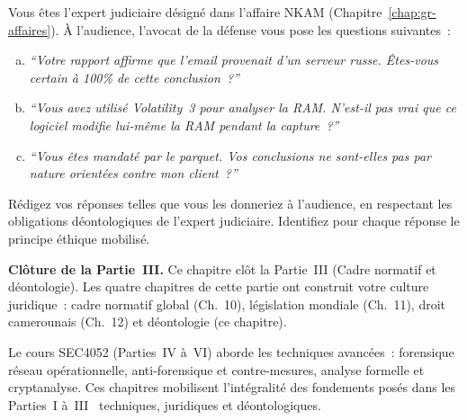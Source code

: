 \begin{boxexo}[title={\ding{45}\quad Exercice~13.3. Simulation décision éthique \niveauexpert}]
Vous êtes l'expert judiciaire désigné dans l'affaire NKAM
(Chapitre~\ref{chap:gr-affaires}). À l'audience, l'avocat de la défense
vous pose les questions suivantes~:
\begin{enumerate}[(a)]
    \item \textit{``Votre rapport affirme que l'email provenait d'un
          serveur russe. Êtes-vous certain à 100\% de cette conclusion~?''}
    \item \textit{``Vous avez utilisé Volatility~3 pour analyser la RAM.
          N'est-il pas vrai que ce logiciel modifie lui-même la RAM
          pendant la capture~?''}
    \item \textit{``Vous êtes mandaté par le parquet. Vos conclusions
          ne sont-elles pas par nature orientées contre mon client~?''}
\end{enumerate}
Rédigez vos réponses telles que vous les donneriez à l'audience, en
respectant les obligations déontologiques de l'expert judiciaire.
Identifiez pour chaque réponse le principe éthique mobilisé.
\end{boxexo}

\bigskip

\begin{boxinfo}
\textbf{Clôture de la Partie~III.} Ce chapitre clôt la Partie~III
(Cadre normatif et déontologie). Les quatre chapitres de cette partie
ont construit votre culture juridique~: cadre normatif global (Ch.~10),
législation mondiale (Ch.~11), droit camerounais (Ch.~12) et déontologie
(ce chapitre).

Le cours SEC4052 (Parties~IV à~VI) aborde les techniques avancées~: forensique
réseau opérationnelle, anti-forensique et contre-mesures, analyse
formelle et cryptanalyse. Ces chapitres mobilisent l'intégralité
des fondements posés dans les Parties~I à~III~ techniques,
juridiques et déontologiques.
\end{boxinfo}

